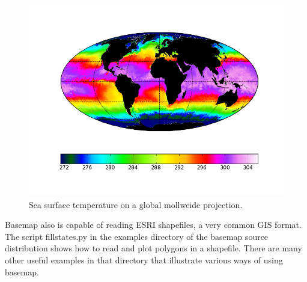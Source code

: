 \pagebreak

\begin{figure}[h]
\includegraphics[scale=0.75]{fig/basemap5}

\caption{Sea surface temperature on a global mollweide projection.}

\end{figure}

\medskip{}

Basemap also is capable of reading ESRI shapefiles, a very common
GIS format. The script fillstates.py in the examples directory of
the basemap source distribution shows how to read and plot polygons
in a shapefile. There are many other useful examples in that directory
that illustrate various ways of using basemap.%
